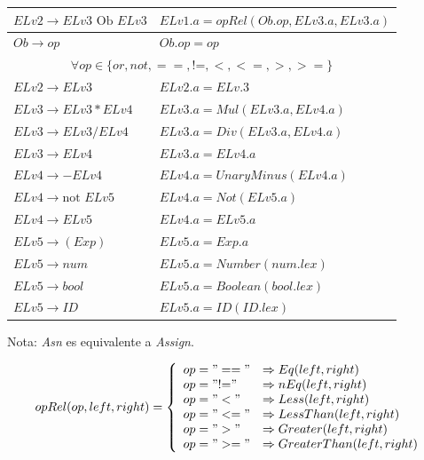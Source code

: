 \documentclass{article}
\begin{document}
\begin{table}[ht!]
\begin{tabular}{|p{4.2cm}|p{7.2cm}|}
		$ELv2 \rightarrow ELv3\text{ Ob } ELv3$ & $ELv1.a = opRel(Ob.op, ELv3.a, ELv3.a)$ \\ \hline
		
		$Ob \rightarrow op$ & $Ob.op = op$ \\ \hline
		
		\multicolumn{2}{|c|}{$\forall op\in\{or, not, ==, \text{!=}, <, <=, >, >=\}$} \\ \hline
		
		$ELv2 \rightarrow ELv3$ & $ELv2.a = ELv.3$ \\ \hline
		
		$ELv3 \rightarrow ELv3 * ELv4$ & $ELv3.a = Mul(ELv3.a, ELv4.a)$ \\ \hline
		$ELv3 \rightarrow ELv3 / ELv4$ & $ELv3.a = Div(ELv3.a, ELv4.a)$ \\ \hline
		
		$ELv3 \rightarrow ELv4$ & $ELv3.a = ELv4.a$ \\ \hline
		
		$ELv4 \rightarrow - ELv4$ & $ELv4.a = UnaryMinus(ELv4.a)$ \\ \hline
		$ELv4 \rightarrow \text{not }ELv5$ & $ELv4.a = Not(ELv5.a)$ \\ \hline
		
		$ELv4 \rightarrow ELv5$ & $ELv4.a = ELv5.a$ \\ \hline
		
		$ELv5 \rightarrow ( Exp )$ & $ELv5.a = Exp.a$ \\ \hline
		$ELv5 \rightarrow num$ & $ELv5.a = Number(num.lex)$ \\ \hline
		$ELv5 \rightarrow bool$ & $ELv5.a = Boolean(bool.lex)$ \\ \hline
		$ELv5 \rightarrow ID$ & $ELv5.a = ID(ID.lex)$ \\ \hline
		
	\end{tabular}
	\newline
	\newline
	Nota: \textit{Asn} es equivalente a \textit{Assign}.

	\[
	opRel(op, left, right)=\left\{
	\begin{array}{ll}
	op = "=="  &\Rightarrow Eq(left, right)\\
	op = "\text{!=}" & \Rightarrow nEq(left, right)\\
	op = "<" &\Rightarrow Less(left, right)\\
	op = "<=" &\Rightarrow LessThan(left, right)\\
	op = ">" &\Rightarrow Greater(left, right)\\
	op = ">=" &\Rightarrow GreaterThan(left, right)\\
	\end{array}
	\right.
	\]
\end{table}
\end{document}
